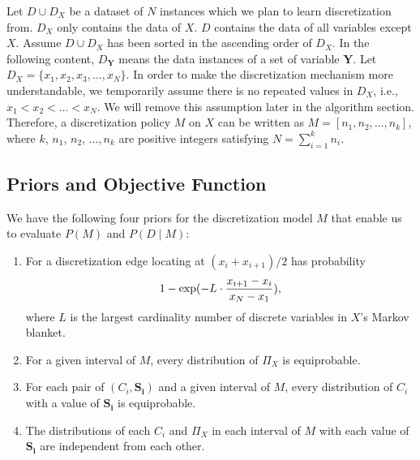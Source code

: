 {Let $D \cup D_X$ be a dataset of $N$ instances which we plan to learn discretization from. $D_X$ only contains the data of $X$. $D$ contains the data of all variables except $X$.  Assume $D \cup D_X$ has been sorted in the ascending order of $D_X$. In the following content, $D_{\boldsymbol{Y}}$ means the data instances of a set of variable $\boldsymbol{Y}$. Let $D_X = \{ x_1,x_2,x_3,\ldots,x_N \}$. In order to make the discretization mechanism more understandable, we temporarily assume there is no repeated values in $D_X$, i.e., $x_1 < x_2 < \ldots < x_N$. We will remove this assumption later in the algorithm section. Therefore, a discretization policy $M$ on $X$ can be written as $M = [n_1,n_2,\ldots,n_k]$, where $k$, $n_1$, $n_2$, $\ldots,n_k$ are positive integers satisfying $N = \sum_{i=1}^k n_i$.



\subsection{Priors and Objective Function}
\label{obj}
We have the following four priors for the discretization model $M$ that enable us to evaluate $P(M)$ and $P(D \mid M)$:\\
\begin{enumerate}
\item For a discretization edge locating at $(x_i + x_{i+1})/2$ has probability
\begin{equation}
1 - {\exp(- L \cdot {{x_{i+1} - x_i}\over{x_N - x_1}})},
\end{equation}
where $L$ is the largest cardinality number of discrete variables in $X$'s Markov blanket.
\item For a given interval of $M$, every distribution of $\Pi_X$ is equiprobable.
\item For each pair of $(C_i,\boldsymbol{S_i})$ and a given interval of $M$, every distribution of $C_i$ with a value of $\boldsymbol{S_i}$ is equiprobable.
\item The distributions of each $C_i$ and $\Pi_X$ in each interval of $M$ with each value of $\boldsymbol{S_i}$ are independent from each other.
\end{enumerate}

}
